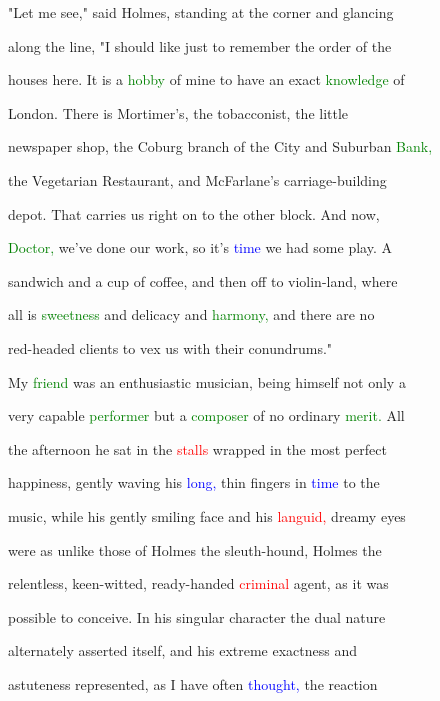  "Let me see," said Holmes, standing at the corner and glancing

 along the line, "I should like just to remember the order of the

 houses here. It is a \textcolor{green}{hobby} of mine to have an exact \textcolor{green}{knowledge} of

 London. There is Mortimer's, the tobacconist, the little

 newspaper shop, the Coburg branch of the City and Suburban \textcolor{green}{Bank,}

 the Vegetarian Restaurant, and McFarlane's carriage-building

 depot. That carries us right on to the other block. And now,

 \textcolor{green}{Doctor,} we've done our work, so it's \textcolor{blue}{time} we had some play. A

 sandwich and a cup of coffee, and then off to violin-land, where

 all is \textcolor{green}{sweetness} and delicacy and \textcolor{green}{harmony,} and there are no

 red-headed clients to vex us with their conundrums."



 My \textcolor{green}{friend} was an enthusiastic musician, being himself not only a

 very capable \textcolor{green}{performer} but a \textcolor{green}{composer} of no ordinary \textcolor{green}{merit.} All

 the afternoon he sat in the \textcolor{red}{stalls} wrapped in the most \textcolor{BurntOrange}{perfect}

 \textcolor{BurntOrange}{happiness,} gently waving his \textcolor{blue}{long,} thin fingers in \textcolor{blue}{time} to the

 \textcolor{BurntOrange}{music,} while his gently \textcolor{BurntOrange}{smiling} face and his \textcolor{red}{languid,} dreamy eyes

 were as unlike those of Holmes the sleuth-hound, Holmes the

 relentless, keen-witted, ready-handed \textcolor{red}{criminal} agent, as it was

 possible to conceive. In his singular character the dual nature

 alternately asserted itself, and his extreme exactness and

 astuteness represented, as I have often \textcolor{blue}{thought,} the reaction

